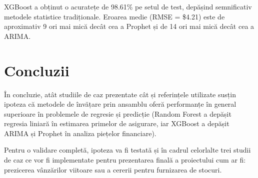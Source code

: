 \documentclass[a4paper,12pt]{article}
\begin{document}
XGBoost a obținut o acuratețe de 98.61\% pe setul de test, depășind semnificativ metodele statistice tradiționale. Eroarea medie (RMSE = \$4.21) este de aproximativ 9 ori mai mică decât cea a Prophet și de 14 ori mai mică decât cea a ARIMA.

\section{Concluzii}
În concluzie, atât studiile de caz prezentate cât și referințele utilizate susțin ipoteza că metodele de învățare prin ansamblu oferă performanțe în general superioare în problemele de regresie și predicție (Random Forest a depășit regresia liniară în estimarea primelor de asigurare, iar XGBoost a depășit ARIMA și Prophet în analiza piețelor financiare).

Pentru o validare completă, ipoteza va fi testată și în cadrul celorlalte trei studii de caz ce vor fi implementate pentru prezentarea finală a proiectului cum ar fi: prezicerea vânzărilor viitoare sau a cererii pentru furnizarea de stocuri.


\printbibliography[title={Bibliografie}]
\end{document}
